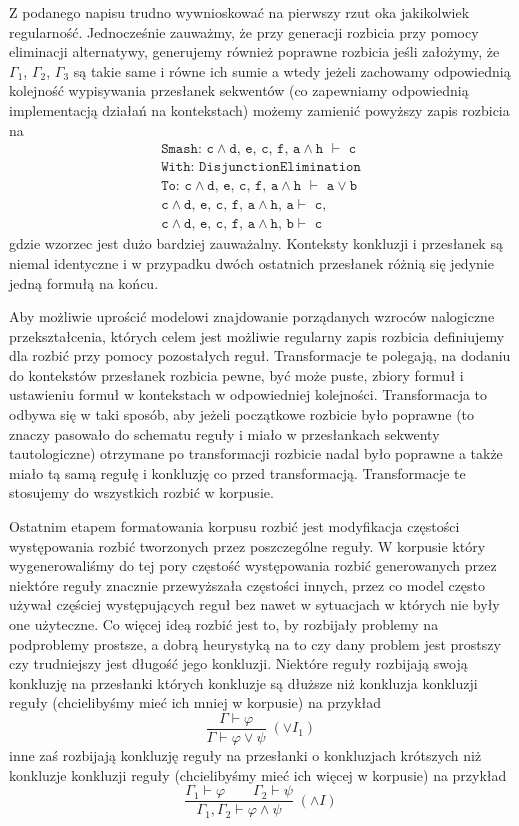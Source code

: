 \documentclass[shortabstract]{iithesis}
\theoremstyle{definition}
\theoremstyle{remark}
\theoremstyle{plain}
\begin{document}
Z podanego napisu trudno wywnioskować na pierwszy rzut oka jakikolwiek regularność. Jednocześnie zauważmy, że przy generacji rozbicia przy pomocy
eliminacji alternatywy, generujemy również poprawne rozbicia jeśli założymy, że $\Gamma_1$, $\Gamma_2$, $\Gamma_3$ są takie same i równe ich sumie 
a wtedy jeżeli zachowamy odpowiednią kolejność wypisywania przesłanek sekwentów (co zapewniamy odpowiednią implementacją działań na kontekstach) możemy zamienić powyższy zapis rozbicia na 
\[
\begin{array}{l}
\texttt{Smash: c}\wedge \texttt{d, e, c, f, a}\wedge\texttt{h } \vdash \texttt{ c}\\
\texttt{With: DisjunctionElimination} \\
\texttt{To: c}\wedge \texttt{d, e, c, f, a}\wedge\texttt{h }\vdash\texttt{ a}\vee\texttt{b}\\
\texttt{c}\wedge \texttt{d, e, c, f, a}\wedge\texttt{h, a} \vdash  \texttt{ c,} \\
\texttt{c}\wedge \texttt{d, e, c, f, a}\wedge\texttt{h, b}\vdash \texttt{ c}
\end{array}
\]
gdzie wzorzec jest dużo bardziej zauważalny. Konteksty konkluzji i przesłanek są niemal identyczne i w przypadku dwóch ostatnich przesłanek różnią się jedynie jedną formułą na końcu.

Aby możliwie uprościć modelowi znajdowanie porządanych wzroców nalogiczne przekształcenia, których celem jest możliwie regularny zapis rozbicia definiujemy dla rozbić przy pomocy pozostałych reguł. 
Transformacje te polegają, na dodaniu do kontekstów przesłanek rozbicia pewne,
być może puste, zbiory formuł i ustawieniu formuł w kontekstach w odpowiedniej kolejności. Transformacja to odbywa się w taki sposób, aby
jeżeli początkowe rozbicie było poprawne (to znaczy pasowało do schematu reguły i miało w przesłankach sekwenty tautologiczne) otrzymane po transformacji
rozbicie nadal było poprawne a także miało tą samą regułę i konkluzję co przed transformacją. Transformacje te stosujemy do wszystkich rozbić w korpusie.


Ostatnim etapem formatowania korpusu rozbić jest modyfikacja częstości występowania rozbić tworzonych przez poszczególne reguły. W korpusie który wygenerowaliśmy do tej pory
częstość występowania rozbić generowanych przez niektóre reguły znacznie przewyższała częstości innych, przez co model często używał częściej występujących reguł bez
nawet w sytuacjach w których nie były one użyteczne. Co więcej ideą rozbić jest to, by rozbijały problemy na podproblemy prostsze, a dobrą heurystyką na to czy dany problem jest prostszy
czy trudniejszy jest długość jego konkluzji. Niektóre reguły rozbijają swoją konkluzję na przesłanki których konkluzje są dłuższe 
niż konkluzja konkluzji reguły (chcielibyśmy mieć ich mniej w korpusie) na przykład
$$\frac{\Gamma \vdash \varphi}{\Gamma \vdash \varphi \vee \psi}\;(\vee I_1)$$
inne zaś rozbijają konkluzję reguły na przesłanki o konkluzjach krótszych niż konkluzje konkluzji reguły (chcielibyśmy mieć ich więcej w korpusie)
na przykład
$$\frac{\Gamma_1 \vdash \varphi \qquad \Gamma_2 \vdash \psi}{\Gamma_1,\Gamma_2 \vdash \varphi \wedge \psi}\;(\wedge I)$$
 
\end{document}
